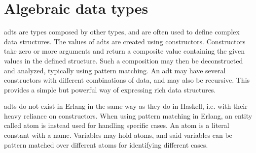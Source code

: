 \section{Algebraic data types}

\Glspl{adt} are types composed by other types, and are often used to define complex data structures. The values of \glspl{adt} are created using constructors. Constructors take zero or more arguments and return a composite value containing the given values in the defined structure. Such a composition may then be deconstructed and analyzed, typically using pattern matching. An \gls{adt} may have several constructors with different combinations of data, and may also be recursive. This provides a simple but powerful way of expressing rich data structures.

\Glspl{adt} do not exist in Erlang in the same way as they do in Haskell, i.e. with their heavy reliance on constructors. When using pattern matching in Erlang, an entity called atom is instead used for handling specific cases. An atom is a literal constant with a name. Variables may hold atoms, and said variables can be pattern matched over different atoms for identifying different cases.